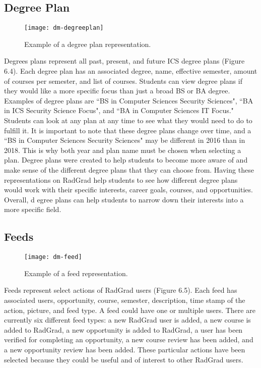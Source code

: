 \subsection{Degree Plan}
\begin{figure}[htbp!]
\centering
\texttt{[image: dm-degreeplan]}
\caption{Example of a degree plan representation.}
\end{figure}
Degrees plans represent all past, present, and future ICS degree plans (Figure 6.4). Each degree plan has an associated degree, name, effective semester, amount of courses per semester, and list of courses. Students can view degree plans if they would like a more specific focus than just a broad BS or BA degree. Examples of degree plans are ``BS in Computer Sciences Security Sciences", ``BA in ICS Security Science Focus", and ``BA in Computer Sciences IT Focus." Students can look at any plan at any time to see what they would need to do to fulfill it. It is important to note that these degree plans change over time, and a ``BS in Computer Sciences Security Sciences" may be different in 2016 than in 2018. This is why both year and plan name must be chosen when selecting a plan.  Degree plans were created to help students to become more aware of and make sense of the different degree plans that they can choose from. Having these representations on RadGrad help students to see how different degree plans would work with their specific interests, career goals, courses, and opportunities. Overall, d
egree plans can help students to narrow down their interests into a more specific field. 

\subsection{Feeds}
\begin{figure}[htbp!]
\centering
\texttt{[image: dm-feed]}
\caption{Example of a feed representation.}
\end{figure}
Feeds represent select actions of RadGrad users (Figure 6.5). Each feed has associated users, opportunity, course, semester, description, time stamp of the action, picture, and feed type. A feed could have one or multiple users. There are currently six different feed types: a new RadGrad user is added, a new course is added to RadGrad, a new opportunity is added to RadGrad, a user has been verified for completing an opportunity, a new course review has been added, and a new opportunity review has been added. These particular actions have been selected because they could be useful and of interest to other RadGrad users.


